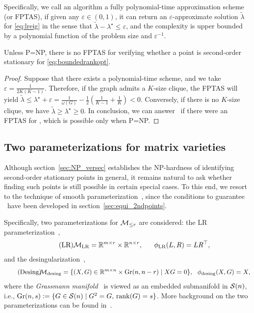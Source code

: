Specifically, we call an algorithm a fully polynomial-time approximation scheme (or FPTAS), if given any $\varepsilon\in(0,1)$, it can return an $\varepsilon$-approximate solution $\tilde{\lambda}$ for \eqref{eq:lreig} in the sense that $\tilde{\lambda}-\lambda^\star\le\varepsilon$, and the complexity is upper bounded by a polynomial function of the problem size and $\varepsilon^{-1}$.
\begin{theorem}[No FPTAS]\label{the:np_approx}
Unless P=NP, there is no FPTAS for verifying whether a point is second-order stationary for \eqref{eq:boundedrankopt}.
\end{theorem}
\begin{proof}
    Suppose that there exists a polynomial-time scheme, and we take $\varepsilon=\frac{1}{2K(K-1)}$. Therefore, if the graph admits a $K$-size clique, the FPTAS will yield $\tilde{\lambda}\le\lambda^\star+\varepsilon=\frac{1}{\omega(G)}-\frac{1}{2}(\frac{1}{K-1}+\frac{1}{K})<0$. Conversely, if there is no $K$-size clique, we have $\tilde{\lambda}\ge\lambda^\star\ge 0$. In conclusion, we can answer \clique\ if there were an FPTAS for \verifysec, which is possible only when P=NP.
\end{proof}




\subsection{Two parameterizations for {matrix varieties}}\label{sec:parameter_matvariety}
Although section~\ref{sec:NP_versec} establishes the NP-hardness of identifying second-order stationary points in general, it remains natural to ask whether finding such points is still possible in certain special cases.
To this end, we resort to the technique of {smooth parameterization}~\cite{levin2025effect}, since the conditions to guarantee \twototwo\ have been developed in section~\ref{sec:equi_2ndpoints}. 

Specifically, two parameterizations for $\mathcal{M}_{\le r}$ are considered: the LR parameterization~\cite{mishra2014fixedLR},
\begin{equation}\label{eq:LR}\tag{LR}
\manifold_{\mathrm{LR}} = \mbR^{m\times r}\times \mbR^{n\times r},\ \ \ \ \ \phiLR(L,R)=LR^\top,
\end{equation}
and the desingularization~\cite{khrulkov2018desingularization,rebjock2024boundedrank},
\begin{equation}\label{eq:desing}\tag{Desing}
\!\!\mathcal{M}_{\mathrm{desing}}=\{(X, G) \in \mathbb{R}^{m \times n} \times \mathrm{Gr}(n, n-r)\mid X G=0\},\ \ \phi_{\mathrm{desing}}(X,G)=X,
\end{equation}
where the \emph{Grassmann manifold}~\cite{bendokat2024grassmann} is viewed as an embedded submanifold in $\mathcal{S}(n)$, i.e., $\mathrm{Gr}(n,s):=\{G\in\mathcal{S}(n)\mid G^2=G,\,\operatorname{rank}(G)=s\}$.
More background on the two parameterizations can be found in~\cite{khrulkov2018desingularization,rebjock2024boundedrank,levin2025effect,yang2025spacedecouple}.

